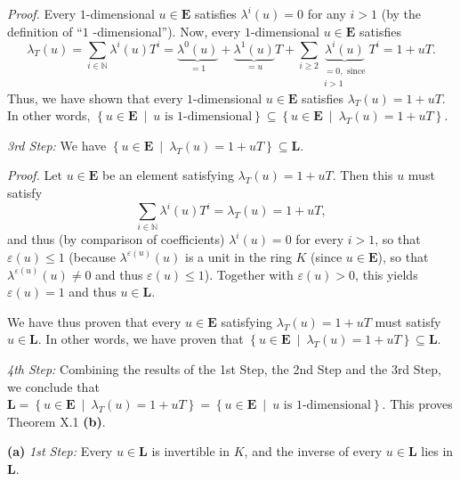 \documentclass[numbers=enddot,12pt,final,onecolumn,notitlepage]{scrartcl}%
\begin{document}
\textit{Proof.} Every $1$-dimensional $u\in\mathbf{E}$ satisfies $\lambda
^{i}\left(  u\right)  =0$ for any $i>1$ (by the definition of ``$1$%
-dimensional''). Now, every $1$-dimensional $u\in\mathbf{E}$ satisfies%
\[
\lambda_{T}\left(  u\right)  =\sum\limits_{i\in\mathbb{N}}\lambda^{i}\left(
u\right)  T^{i}=\underbrace{\lambda^{0}\left(  u\right)  }_{=1}%
+\underbrace{\lambda^{1}\left(  u\right)  }_{=u}T+\sum\limits_{i\geq
2}\underbrace{\lambda^{i}\left(  u\right)  }_{\substack{=0,\text{ since}%
\\i>1}}T^{i}=1+uT.
\]
Thus, we have shown that every $1$-dimensional $u\in\mathbf{E}$ satisfies
$\lambda_{T}\left(  u\right)  =1+uT$. In other words, $\left\{  u\in
\mathbf{E}\ \mid\ u\text{ is }1\text{-dimensional}\right\}  \subseteq\left\{
u\in\mathbf{E}\ \mid\ \lambda_{T}\left(  u\right)  =1+uT\right\}  $.

\textit{3rd Step:} We have $\left\{  u\in\mathbf{E}\ \mid\ \lambda_{T}\left(
u\right)  =1+uT\right\}  \subseteq\mathbf{L}$.

\textit{Proof.} Let $u\in\mathbf{E}$ be an element satisfying $\lambda
_{T}\left(  u\right)  =1+uT$. Then this $u$ must satisfy%
\[
\sum\limits_{i\in\mathbb{N}}\lambda^{i}\left(  u\right)  T^{i}=\lambda
_{T}\left(  u\right)  =1+uT,
\]
and thus (by comparison of coefficients) $\lambda^{i}\left(  u\right)  =0$ for
every $i>1$, so that $\varepsilon\left(  u\right)  \leq1$ (because
$\lambda^{\varepsilon\left(  u\right)  }\left(  u\right)  $ is a unit in the
ring $K$ (since $u\in\mathbf{E}$), so that $\lambda^{\varepsilon\left(
u\right)  }\left(  u\right)  \neq0$ and thus $\varepsilon\left(  u\right)
\leq1$). Together with $\varepsilon\left(  u\right)  >0$, this yields
$\varepsilon\left(  u\right)  =1$ and thus $u\in\mathbf{L}$.

We have thus proven that every $u\in\mathbf{E}$ satisfying $\lambda_{T}\left(
u\right)  =1+uT$ must satisfy $u\in\mathbf{L}$. In other words, we have proven
that $\left\{  u\in\mathbf{E}\ \mid\ \lambda_{T}\left(  u\right)
=1+uT\right\}  \subseteq\mathbf{L}$.

\textit{4th Step:} Combining the results of the 1st Step, the 2nd Step and the
3rd Step, we conclude that $\mathbf{L}=\left\{  u\in\mathbf{E}\ \mid
\ \lambda_{T}\left(  u\right)  =1+uT\right\}  =\left\{  u\in\mathbf{E}%
\ \mid\ u\text{ is }1\text{-dimensional}\right\}  $. This proves Theorem X.1
\textbf{(b)}.

\textbf{(a)} \textit{1st Step:} Every $u\in\mathbf{L}$ is invertible in $K$,
and the inverse of every $u\in\mathbf{L}$ lies in $\mathbf{L}$.
\end{document}
